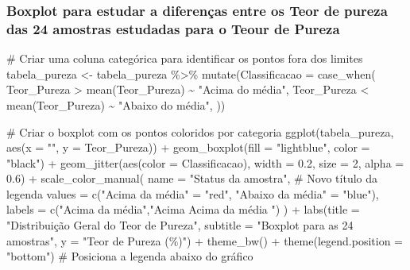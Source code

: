 \documentclass[
  letterpaper,
  DIV=11,
  numbers=noendperiod]{scrartcl}
\newenvironment{Shaded}{\begin{snugshade}}{\end{snugshade}}
\newcommand{\AttributeTok}[1]{\textcolor[rgb]{0.40,0.45,0.13}{#1}}
\newcommand{\CommentTok}[1]{\textcolor[rgb]{0.37,0.37,0.37}{#1}}
\newcommand{\DecValTok}[1]{\textcolor[rgb]{0.68,0.00,0.00}{#1}}
\newcommand{\FloatTok}[1]{\textcolor[rgb]{0.68,0.00,0.00}{#1}}
\newcommand{\FunctionTok}[1]{\textcolor[rgb]{0.28,0.35,0.67}{#1}}
\newcommand{\NormalTok}[1]{\textcolor[rgb]{0.00,0.23,0.31}{#1}}
\newcommand{\OtherTok}[1]{\textcolor[rgb]{0.00,0.23,0.31}{#1}}
\newcommand{\SpecialCharTok}[1]{\textcolor[rgb]{0.37,0.37,0.37}{#1}}
\newcommand{\StringTok}[1]{\textcolor[rgb]{0.13,0.47,0.30}{#1}}
\begin{document}
\subsubsection{Boxplot para estudar a diferenças entre os Teor de pureza
das 24 amostras estudadas para o Teour de
Pureza}\label{boxplot-para-estudar-a-diferenuxe7as-entre-os-teor-de-pureza-das-24-amostras-estudadas-para-o-teour-de-pureza}

\begin{Shaded}
\begin{Highlighting}[]
\CommentTok{\# Criar uma coluna categórica para identificar os pontos fora dos limites}
\NormalTok{tabela\_pureza }\OtherTok{\textless{}{-}}\NormalTok{ tabela\_pureza }\SpecialCharTok{\%\textgreater{}\%}
  \FunctionTok{mutate}\NormalTok{(}\AttributeTok{Classificacao =} \FunctionTok{case\_when}\NormalTok{(}
\NormalTok{    Teor\_Pureza }\SpecialCharTok{\textgreater{}} \FunctionTok{mean}\NormalTok{(Teor\_Pureza) }\SpecialCharTok{\textasciitilde{}} \StringTok{"Acima do média"}\NormalTok{,}
\NormalTok{    Teor\_Pureza }\SpecialCharTok{\textless{}} \FunctionTok{mean}\NormalTok{(Teor\_Pureza) }\SpecialCharTok{\textasciitilde{}} \StringTok{"Abaixo do média"}\NormalTok{,}
\NormalTok{  ))}

\CommentTok{\# Criar o boxplot com os pontos coloridos por categoria}
\FunctionTok{ggplot}\NormalTok{(tabela\_pureza, }\FunctionTok{aes}\NormalTok{(}\AttributeTok{x =} \StringTok{""}\NormalTok{, }\AttributeTok{y =}\NormalTok{ Teor\_Pureza)) }\SpecialCharTok{+}
  \FunctionTok{geom\_boxplot}\NormalTok{(}\AttributeTok{fill =} \StringTok{"lightblue"}\NormalTok{, }\AttributeTok{color =} \StringTok{"black"}\NormalTok{) }\SpecialCharTok{+}
  \FunctionTok{geom\_jitter}\NormalTok{(}\FunctionTok{aes}\NormalTok{(}\AttributeTok{color =}\NormalTok{ Classificacao), }\AttributeTok{width =} \FloatTok{0.2}\NormalTok{, }\AttributeTok{size =} \DecValTok{2}\NormalTok{, }\AttributeTok{alpha =} \FloatTok{0.6}\NormalTok{) }\SpecialCharTok{+}
  \FunctionTok{scale\_color\_manual}\NormalTok{(}
    \AttributeTok{name =} \StringTok{"Status da amostra"}\NormalTok{,  }\CommentTok{\# Novo título da legenda}
    \AttributeTok{values =} \FunctionTok{c}\NormalTok{(}\StringTok{"Acima da média"} \OtherTok{=} \StringTok{"red"}\NormalTok{, }\StringTok{"Abaixo da média"} \OtherTok{=} \StringTok{"blue"}\NormalTok{),}
    \AttributeTok{labels =} \FunctionTok{c}\NormalTok{(}\StringTok{"Acima da média"}\NormalTok{,}\StringTok{"Acima Acima da média "}\NormalTok{)}
\NormalTok{  ) }\SpecialCharTok{+}
  \FunctionTok{labs}\NormalTok{(}\AttributeTok{title =} \StringTok{"Distribuição Geral do Teor de Pureza"}\NormalTok{,}
       \AttributeTok{subtitle =} \StringTok{"Boxplot para as 24 amostras"}\NormalTok{,}
       \AttributeTok{y =} \StringTok{"Teor de Pureza (\%)"}\NormalTok{) }\SpecialCharTok{+}
  \FunctionTok{theme\_bw}\NormalTok{() }\SpecialCharTok{+}
  \FunctionTok{theme}\NormalTok{(}\AttributeTok{legend.position =} \StringTok{"bottom"}\NormalTok{)  }\CommentTok{\# Posiciona a legenda abaixo do gráfico}
\end{Highlighting}
\end{Shaded}
\end{document}
